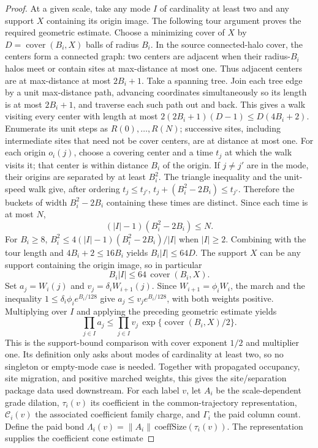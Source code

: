 \begin{proof}
At a given scale, take any mode $I$ of cardinality at least two and any support $X$ containing its origin image. The following tour argument proves the required geometric estimate. Choose a minimizing cover of $X$ by $D=\operatorname{cover}(B_i,X)$ balls of radius $B_i$. In the source connected-halo cover, the centers form a connected graph: two centers are adjacent when their radius-$B_i$ halos meet or contain sites at max-distance at most one. Thus adjacent centers are at max-distance at most $2B_i+1$. Take a spanning tree. Join each tree edge by a unit max-distance path, advancing coordinates simultaneously so its length is at most $2B_i+1$, and traverse each such path out and back. This gives a walk visiting every center with length at most $2(2B_i+1)(D-1)\leq D(4B_i+2)$. Enumerate its unit steps as $R(0),\ldots,R(N)$; successive sites, including intermediate sites that need not be cover centers, are at distance at most one. For each origin $o_i(j)$, choose a covering center and a time $t_j$ at which the walk visits it; that center is within distance $B_i$ of the origin. If $j\ne j'$ are in the mode, their origins are separated by at least $B_i^2$. The triangle inequality and the unit-speed walk give, after ordering $t_j\leq t_{j'}$, $t_j+(B_i^2-2B_i)\leq t_{j'}$. Therefore the buckets of width $B_i^2-2B_i$ containing these times are distinct. Since each time is at most $N$,
\[
 (|I|-1)(B_i^2-2B_i)\leq N.
\]
For $B_i\geq8$, $B_i^2\leq 4(|I|-1)(B_i^2-2B_i)/|I|$ when $|I|\geq2$. Combining with the tour length and $4B_i+2\leq16B_i$ yields $B_i|I|\leq64D$. The support $X$ can be any support containing the origin image, so in particular
\[
 B_i|I|\leq64\,\operatorname{cover}(B_i,X).
\]
Set $a_j=W_i(j)$ and $v_j=\delta_iW_{i+1}(j)$. Since $W_{i+1}=\phi_iW_i$, the march and the inequality $1\leq\delta_i\phi_i e^{B_i/128}$ give $a_j\leq v_j e^{B_i/128}$, with both weights positive. Multiplying over $I$ and applying the preceding geometric estimate yields
\[
 \prod_{j\in I}a_j\leq\prod_{j\in I}v_j\,
 \exp\{\operatorname{cover}(B_i,X)/2\}.
\]
This is the support-bound comparison with cover exponent $1/2$ and multiplier one. Its definition only asks about modes of cardinality at least two, so no singleton or empty-mode case is needed. Together with propagated occupancy, site migration, and positive marched weights, this gives the site/separation package data used downstream.
For each label $v$, let $A_i$ be the scale-dependent grade dilation, $\tau_i(v)$ its coefficient in the common-trajectory representation, $\mathcal C_i(v)$ the associated coefficient family charge, and $\Gamma_i$ the paid column count. Define the paid bond $\Lambda_i(v)=\|A_i\|\,\mathrm{coeffSize}(\tau_i(v))$. The representation supplies the coefficient cone estimate

\end{proof}
